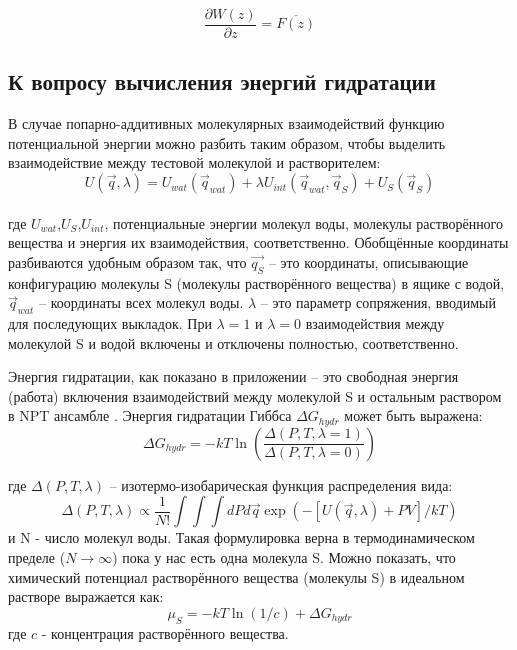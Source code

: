 \begin{equation}
\frac{\partial W(z)}{\partial z}=\overline{F(z)}
\end{equation}

\subsection{\label{hfe_theor_backgr}К вопросу вычисления энергий гидратации}

В случае попарно-аддитивных молекулярных взаимодействий функцию потенциальной энергии можно разбить таким образом, чтобы выделить взаимодействие между тестовой молекулой и растворителем:
\begin{equation}
U(\vec{q},\lambda)=U_{wat}(\vec{q}_{wat})+\lambda U_{int}(\vec{q}_{wat},\vec{q}_{S})+U_S(\vec{q}_{S})
\label{pot_ener}
\end{equation}
\\
где $U_{wat}$,$U_{S}$,$U_{int}$, потенциальные энергии молекул воды, молекулы растворённого вещества и энергия их взаимодействия, соответственно.
Обобщённые координаты разбиваются удобным образом так, что $\vec{q_{S}}$ -- это координаты, описывающие конфигурацию молекулы S (молекулы растворённого вещества) в ящике с водой, $\vec{q}_{wat}$ -- координаты всех молекул воды.
$\lambda$ -- это параметр сопряжения, вводимый для последующих выкладок. При $\lambda=1$ и $\lambda=0$ взаимодействия между молекулой S и водой включены и отключены полностью, соответственно. 

Энергия гидратации, как показано в приложении -- это свободная энергия (работа) включения взаимодействий между молекулой S и остальным раствором в NPT ансамбле \cite{shaytan_free_2010}. 
Энергия гидратации Гиббса $\Delta G_{hydr}$ может быть выражена:
\begin{equation}
\Delta G_{hydr}=-kT \ln \left( \frac{\Delta (P,T,\lambda=1)}{\Delta (P,T,\lambda=0)} \right)
\label{hydr_fe_sim}
\end{equation}

где  $\Delta (P,T,\lambda)$ -- изотермо-изобарическая функция распределения вида:
\begin{equation}
\Delta (P,T,\lambda) \propto \frac{1}{N!}\int\int\int dPd\vec{q}\exp\left(-\left[U(\vec{q},\lambda)+PV\right]/kT\right)
\label{hydr_fe_expr}
\end{equation}
и N - число молекул воды. Такая формулировка верна в термодинамическом пределе  ($N\rightarrow\infty$) пока у нас есть одна молекула S.
Можно показать, что химический потенциал растворённого вещества (молекулы S) в идеальном растворе выражается как:
\begin{equation}
\mu_S=-kT\ln(1/c)+\Delta G_{hydr}
\label{chem_pot}
\end{equation}
где $c$ - концентрация растворённого вещества.

